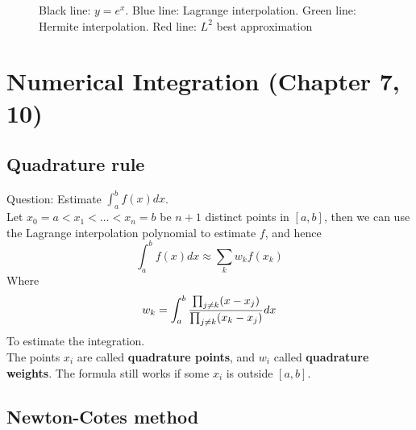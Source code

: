 \documentclass[20pt]{article} %
\theoremstyle{break}
\begin{document}
\newpage


\begin{figure}[H]
\caption{Black line: $y=e^x$. Blue line: Lagrange interpolation. Green line: Hermite interpolation. Red line: $L^2$ best approximation}
\end{figure}

\newpage


\section{Numerical Integration (Chapter 7, 10)}

\subsection{Quadrature rule}

Question: Estimate $\int_a^bf(x)dx$.\\

Let $x_0=a<x_1<\dots<x_n=b$ be $n+1$ distinct points in $[a, b]$, then we can use the Lagrange interpolation polynomial to estimate $f$, and hence 
\[\int_a^b f(x)dx\approx \sum_kw_kf(x_k)\]
  Where
  \[w_k=\int_a^b {\prod_{j\not=k}(x-x_j)\over \prod_{j\not=k}(x_k-x_j)} dx\]
To estimate the integration.\\

The points $x_i$ are called {\bf quadrature points}, and $w_i$ called {\bf quadrature weights}. The formula still works if some $x_i$ is outside $[a, b]$.

\newpage

\subsection{Newton-Cotes method}
\end{document}
